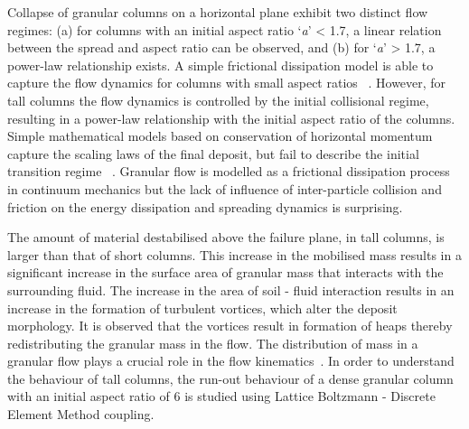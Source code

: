 \documentclass[epj,twocolumn]{webofc}
\begin{document}
Collapse of granular columns on a horizontal plane exhibit two distinct flow regimes:
(a) for columns with an initial aspect ratio `\textit{a}’ < 1.7, a linear relation between the
spread and aspect ratio can be observed, and (b) for `\textit{a}’ > 1.7, a power-law
relationship exists. A simple frictional dissipation model is able to
capture the flow dynamics for columns with small aspect ratios
~\cite{soundararajan2015}. However, for tall columns the flow
dynamics is controlled by the initial collisional regime, resulting in a
power-law relationship with the initial aspect ratio of the columns. 
Simple mathematical models based on conservation of horizontal momentum 
capture the scaling laws of the final deposit, but fail to describe the 
initial transition regime ~\cite{Kumar2012}. Granular flow is modelled as 
a frictional dissipation process in continuum mechanics but the lack of 
influence of inter-particle collision and friction on the energy dissipation and spreading dynamics is surprising.

The amount of material destabilised above the failure plane, in tall columns,
is larger than that of short columns. This increase in the mobilised mass
results in a significant increase in the surface area of granular mass that
interacts with the surrounding fluid. The increase in the area of soil -
fluid interaction results in an increase
in the formation of turbulent vortices, which alter the deposit morphology. 
It is observed that the vortices result in formation of heaps 
thereby redistributing the granular mass in the flow.
The distribution of mass in a granular flow plays a crucial role in the
flow kinematics~\cite{Staron2007a}. In order to understand the
behaviour of tall columns, the run-out behaviour of a dense granular column
with an initial aspect ratio of 6 is studied using Lattice Boltzmann - Discrete
Element Method coupling.
\end{document}
